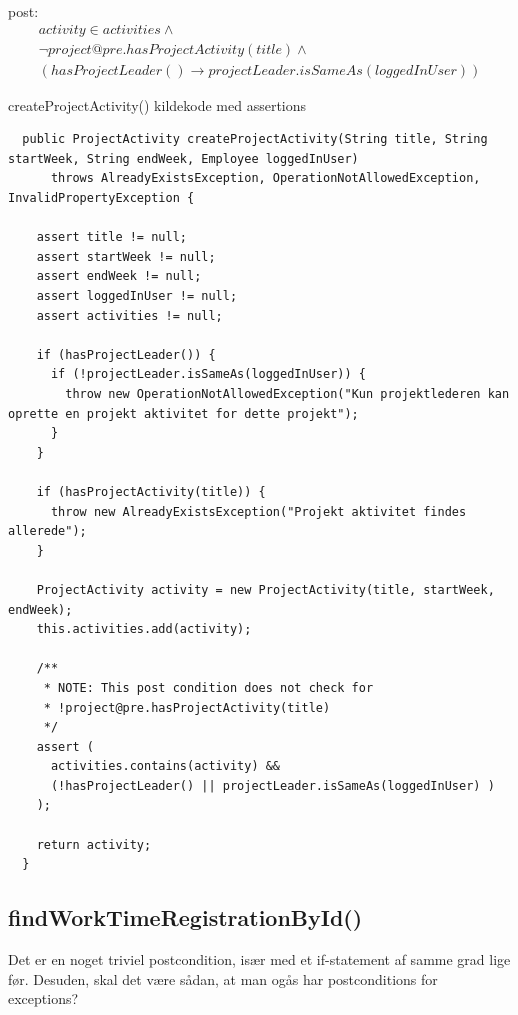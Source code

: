 post: 
\begin{equation}
\begin{gathered}
    activity \in activities \wedge \\
    \neg project@pre.hasProjectActivity(title) \wedge \\
    (hasProjectLeader() \to projectLeader.isSameAs(loggedInUser))
\end{gathered}
\end{equation}

\begin{listing}[H]
    \centering
    \caption{createProjectActivity() kildekode med assertions}\label{lst:create_project_activity_assertions}
    \begin{verbatim}
  public ProjectActivity createProjectActivity(String title, String startWeek, String endWeek, Employee loggedInUser)
      throws AlreadyExistsException, OperationNotAllowedException, InvalidPropertyException {

    assert title != null;
    assert startWeek != null;
    assert endWeek != null;
    assert loggedInUser != null;
    assert activities != null;

    if (hasProjectLeader()) {
      if (!projectLeader.isSameAs(loggedInUser)) {
        throw new OperationNotAllowedException("Kun projektlederen kan oprette en projekt aktivitet for dette projekt");
      }
    }

    if (hasProjectActivity(title)) {
      throw new AlreadyExistsException("Projekt aktivitet findes allerede");
    }

    ProjectActivity activity = new ProjectActivity(title, startWeek, endWeek);
    this.activities.add(activity);

    /**
     * NOTE: This post condition does not check for 
     * !project@pre.hasProjectActivity(title)
     */
    assert (
      activities.contains(activity) &&
      (!hasProjectLeader() || projectLeader.isSameAs(loggedInUser) )
    );

    return activity;
  }
    \end{verbatim}
\end{listing}


\subsection{findWorkTimeRegistrationById()}

Det er en noget triviel postcondition, især med et if-statement af samme grad lige før. Desuden, skal det være sådan, at man ogås har postconditions for exceptions?

